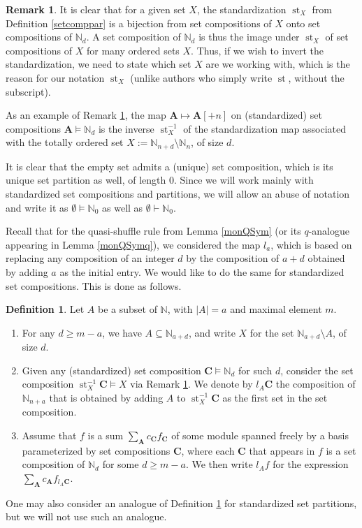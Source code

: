 \documentclass{article}
\theoremstyle{definition}
\newtheorem{defn}[thm]{Definition}
\newtheorem{rmk}[thm]{Remark}
\begin{document}
\begin{rmk}
It is clear that for a given set $X$, the standardization $\operatorname{st}_{X}$ from Definition \ref{setcomppar} is a bijection from set compositions of $X$ onto set compositions of $\mathbb{N}_{d}$. A set composition of $\mathbb{N}_{d}$ is thus the image under $\operatorname{st}_{X}$ of set compositions of $X$ for many ordered sets $X$. Thus, if we wish to invert the standardization, we need to state which set $X$ are we working with, which is the reason for our notation $\operatorname{st}_{X}$ (unlike authors who simply write $\operatorname{st}$, without the subscript). \label{stdbij}
\end{rmk}
As an example of Remark \ref{stdbij}, the map $\mathbf{A}\mapsto\mathbf{A}[+n]$ on (standardized) set compositions $\mathbf{A}\vDash\mathbb{N}_{d}$ is the inverse $\operatorname{st}_{X}^{-1}$ of the standardization map associated with the totally ordered set $X:=\mathbb{N}_{n+d}\setminus\mathbb{N}_{n}$, of size $d$.

It is clear that the empty set admits a (unique) set composition, which is its unique set partition as well, of length 0. Since we will work mainly with standardized set compositions and partitions, we will allow an abuse of notation and write it as $\emptyset\vDash\mathbb{N}_{0}$ as well as $\emptyset\vdash\mathbb{N}_{0}$.

\medskip

Recall that for the quasi-shuffle rule from Lemma \ref{monQSym} (or its $q$-analogue appearing in Lemma \ref{monQSymq}), we considered the map $l_{a}$, which is based on replacing any composition of an integer $d$ by the composition of $a+d$ obtained by adding $a$ as the initial entry. We would like to do the same for standardized set compositions. This is done as follows.
\begin{defn}
Let $A$ be a subset of $\mathbb{N}$, with $|A|=a$ and maximal element $m$.
\begin{enumerate}[$(i)$]
\item For any $d \geq m-a$, we have $A\subseteq\mathbb{N}_{a+d}$, and write $X$ for the set $\mathbb{N}_{a+d} \setminus A$, of size $d$.
\item Given any (standardized) set composition $\mathbf{C}\vDash\mathbb{N}_{d}$ for such $d$, consider the set composition $\operatorname{st}_{X}^{-1}\mathbf{C} \vDash X$ via Remark \ref{stdbij}. We denote by $l_{A}\mathbf{C}$ the composition of $\mathbb{N}_{n+a}$ that is obtained by adding $A$ to $\operatorname{st}_{X}^{-1}\mathbf{C}$ as the first set in the set composition.
\item Assume that $f$ is a sum $\sum_{\mathbf{A}}c_{\mathbf{C}}f_{\mathbf{C}}$ of some module spanned freely by a basis parameterized by set compositions $\mathbf{C}$, where each $\mathbf{C}$ that appears in $f$ is a set composition of $\mathbb{N}_{d}$ for some $d \geq m-a$. We then write $l_{A}f$ for the expression $\sum_{\mathbf{A}}c_{\mathbf{A}}f_{l_{A}\mathbf{C}}$.
\end{enumerate} \label{insset}
\end{defn}
One may also consider an analogue of Definition \ref{insset} for standardized set partitions, but we will not use such an analogue.
\end{document}
